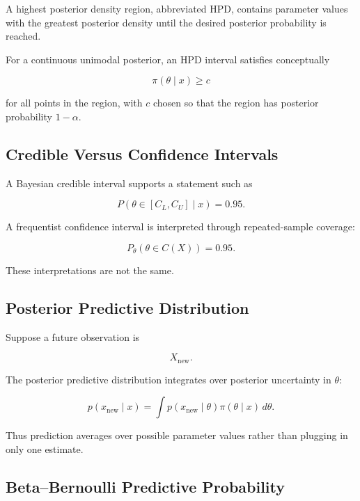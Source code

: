 A highest posterior density region, abbreviated HPD, contains parameter
values with the greatest posterior density until the desired posterior
probability is reached.

For a continuous unimodal posterior, an HPD interval satisfies
conceptually

\[
\boxed{
\pi(\theta\mid x)
\geq
c
}
\]

for all points in the region, with \(c\) chosen so that the region has
posterior probability \(1-\alpha\).

\subsection{Credible Versus Confidence Intervals}
\label{subsec:credible-versus-confidence}

A Bayesian credible interval supports a statement such as

\[
\boxed{
P
(
\theta\in[C_L,C_U]
\mid x
)
=
0.95.
}
\]

A frequentist confidence interval is interpreted through repeated-sample
coverage:

\[
\boxed{
P_\theta
(
\theta\in C(X)
)
=
0.95.
}
\]

These interpretations are not the same.

\subsection{Posterior Predictive Distribution}
\label{subsec:posterior-predictive}

Suppose a future observation is

\[
X_{\text{new}}.
\]

The posterior predictive distribution integrates over posterior
uncertainty in \(\theta\):

\[
\boxed{
p
(
x_{\text{new}}
\mid x
)
=
\int
p
(
x_{\text{new}}
\mid\theta
)
\pi(\theta\mid x)
\,d\theta.
}
\]

Thus prediction averages over possible parameter values rather than
plugging in only one estimate.

\subsection{Beta--Bernoulli Predictive Probability}
\label{subsec:beta-bernoulli-predictive}

